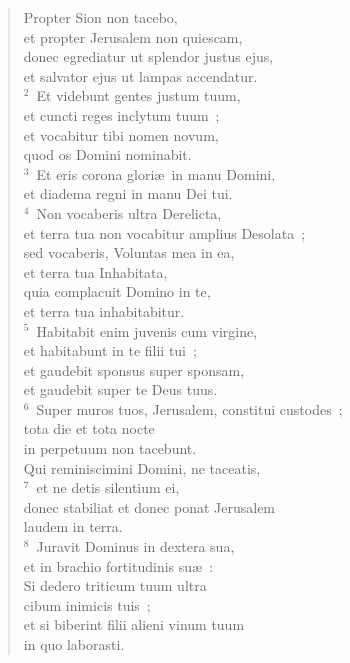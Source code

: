 \begin{flushleft}\begin{verse}\vspace{-19pt}\hspace{6pt}Propter Sion non tacebo,\\\hspace{6pt} et propter Jerusalem non quiescam,\\ donec egrediatur ut splendor justus ejus,\\ et salvator ejus ut lampas accendatur.\\
${}^{2}$~Et videbunt gentes justum tuum,\\ et cuncti reges inclytum tuum~;\\ et vocabitur tibi nomen novum,\\ quod os Domini nominabit.\\
${}^{3}$~Et eris corona glori\ae\ in manu Domini,\\ et diadema regni in manu Dei tui.\\
${}^{4}$~Non vocaberis ultra Derelicta,\\ et terra tua non vocabitur amplius Desolata~;\\ sed vocaberis, Voluntas mea in ea,\\ et terra tua Inhabitata,\\ quia complacuit Domino in te,\\ et terra tua inhabitabitur.\\
${}^{5}$~Habitabit enim juvenis cum virgine,\\ et habitabunt in te filii tui~;\\ et gaudebit sponsus super sponsam,\\ et gaudebit super te Deus tuus.\\
${}^{6}$~Super muros tuos, Jerusalem, constitui custodes~;\\ tota die et tota nocte\\ in perpetuum non tacebunt.\\ Qui reminiscimini Domini, ne taceatis,\\
${}^{7}$~et ne detis silentium ei,\\ donec stabiliat et donec ponat Jerusalem\\ laudem in terra.\\
${}^{8}$~Juravit Dominus in dextera sua,\\ et in brachio fortitudinis su\ae~:\\ Si dedero triticum tuum ultra\\ cibum inimicis tuis~;\\ et si biberint filii alieni vinum tuum\\ in quo laborasti.\\

\end{verse}
\end{flushleft}
